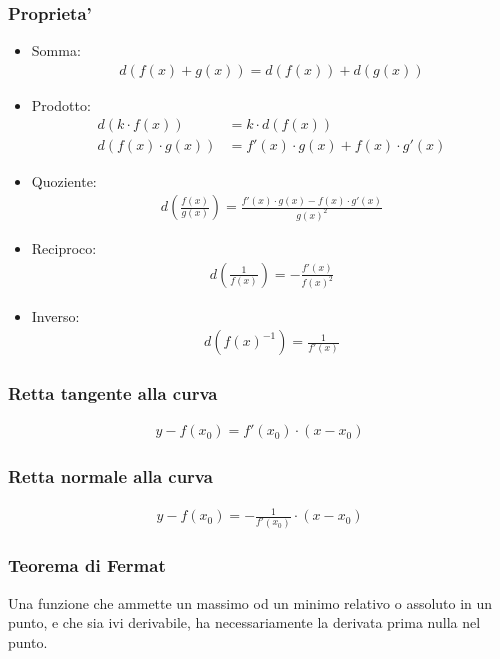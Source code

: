 \documentclass[a4paper]{article}
\begin{document}
	\subsubsection{Proprieta'}
	\begin{itemize}
		\item Somma:
		\begin{align*}
			d(f(x) + g(x)) = d(f(x))+d(g(x))
		\end{align*}
		\item  Prodotto:
		\begin{align*}
			d(k \cdot f(x)) &= k \cdot d(f(x))\\
			d(f(x) \cdot g(x)) &= f'(x) \cdot g(x) + f(x) \cdot g'(x)
		\end{align*}
		\item Quoziente:
		\begin{align*}
			d\left( \frac{f(x)}{g(x)} \right) = \frac{f'(x) \cdot g(x) - f(x) \cdot g'(x)}{g(x)^2}
		\end{align*}
		\item Reciproco:
		\begin{align*}
			d\left( \frac{1}{f(x)} \right) = -\frac{f'(x)}{f(x)^2}
		\end{align*}
		\item Inverso:
		\begin{align*}
			d \left( f(x)^{-1} \right) = \frac{1}{f'(x)}
		\end{align*}
	\end{itemize}

	\subsubsection{Retta tangente alla curva}
	\begin{align*}
		y - f(x_0) = f'(x_0) \cdot (x-x_0)
	\end{align*}
	
	\subsubsection{Retta normale alla curva}
	\begin{align*}
		y - f(x_0) = -\frac{1}{f'(x_0)} \cdot (x-x_0)
	\end{align*}

	\subsubsection{Teorema di Fermat}
	Una funzione che ammette un massimo od un minimo relativo o assoluto in un punto, e che sia ivi derivabile, ha necessariamente la derivata prima nulla nel punto.
\end{document}
